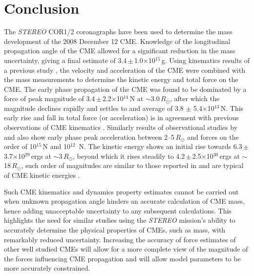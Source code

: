  \section{Conclusion} \label{bozomath}
 The \emph{STEREO} COR1/2 coronagraphs have been used to determine the mass development of the 2008 December 12 CME. Knowledge of 
the longitudinal propagation angle of the CME allowed for a significant reduction in the mass uncertainty, giving a final estimate of 
3.4\,$\pm$\,1.0$\times$10$^{15}$\,g. Using kinematics results of a previous study \citep{byr10}, the velocity and acceleration of the CME were
 combined with the mass measurements to determine the kinetic energy and total force on the CME. The early phase propagation of the CME was found to be 
dominated by a force of peak magnitude of 3.4\,$\pm$\,2.2$\times$10$^{14}$\,N at $\sim$3.0\,$R_{\odot}$, after which the magnitude declines 
rapidly and settles to and average of 3.8 $\pm$ 5.4$\times$10$^{13}$\,N. This early rise and fall in total force (or acceleration) is in agreement 
with previous observations of CME kinematics \citep{gallagher03, bein2011}. Similarly results of observational studies by \citet{zhang2001} and 
\citet{zhang2004} also show early phase peak acceleration between 2--5\,$R_{\odot}$ and forces on the order of 10$^{15}$\,N and 10$^{12}$
\,N. The kinetic energy shows an initial rise towards 6.3\,$\pm$\,3.7$\times$10$^{29}$\,ergs at $\sim$3\,$R_{\odot}$, beyond which it rises 
steadily to 4.2\,$\pm$\,2.5$\times$10$^{30}$\,ergs at $\sim$18\,$R_{\odot}$, such order of magnitudes are similar to those reported in \citet
{vou00,emslie2004} and are typical of CME kinetic energies \citep{vour2010}.

Such CME kinematics and dynamics property estimates cannot be carried out when unknown propagation angle hinders an accurate calculation of 
CME mass, hence adding unacceptable uncertainty to any subsequent calculations. This highlights the need for similar studies using the \emph
{STEREO} mission's ability to accurately determine the physical properties of CMEs, such as mass, with remarkably reduced uncertainty. 
Increasing the accuracy of force estimates of other well studied CMEs will allow for a more complete view of the magnitude of the forces influencing 
CME propagation and will allow model parameters to be more accurately constrained.




